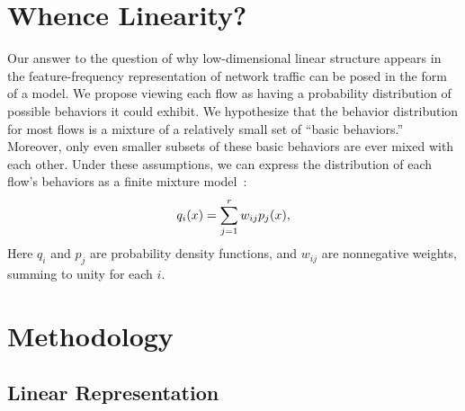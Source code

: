 \documentclass[conference]{IEEEtran}
\begin{document}
\section{Whence Linearity?}

Our answer to the question of why low-dimensional linear structure appears in the feature-frequency representation of network traffic can be posed in the form of a model.
We propose viewing each flow as having a probability distribution of possible behaviors it could exhibit.
We hypothesize that the behavior distribution for most flows is a mixture of a relatively small set of ``basic behaviors.''
Moreover, only even smaller subsets of these basic behaviors are ever mixed with each other.
Under these assumptions, we can express the distribution of each flow's behaviors as a finite mixture model~\cite{McLachlan00}:
\begin{align}\eqn{mixture-model}
  q_i(x) = \sum_{j=1}^r w_{ij} p_j(x),
\end{align}
Here $q_i$ and $p_j$ are probability density functions, and $w_{ij}$ are nonnegative weights, summing to unity for each $i$.




\vfill
\break

\section{Methodology}

\subsection{Linear Representation}
\end{document}
